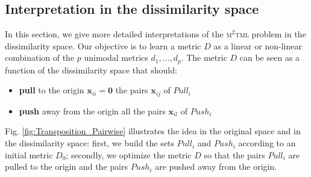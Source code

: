 \subsection{Interpretation in the dissimilarity space}
In this section, we give more detailed interpretations of the \textsc{m$^2$tml} problem in the dissimilarity space. Our objective is to learn a metric $D$ as a linear or non-linear combination of the $p$ unimodal metrics $d_1, \ldots, d_p$. The metric $D$ can be seen as a function of the dissimilarity space that should:
\begin{itemize}
	\item \textbf{pull} to the origin $\textbf{x}_{ii} = \textbf{0}$ the pairs $\textbf{x}_{ij}$ of $Pull_i$
	\item \textbf{push} away from the origin all the pairs $\textbf{x}_{il}$ of $Push_i$
\end{itemize}
Fig. \ref{fig:Transposition_Pairwise} illustrates the idea in the original space and in the dissimilarity space: first, we build the sets $Pull_i$ and $Push_i$ according to an initial metric $D_0$; secondly, we optimize the metric $D$ so that the pairs $Pull_i$ are pulled to the origin and the pairs $Push_i$ are pushed away from the origin.

